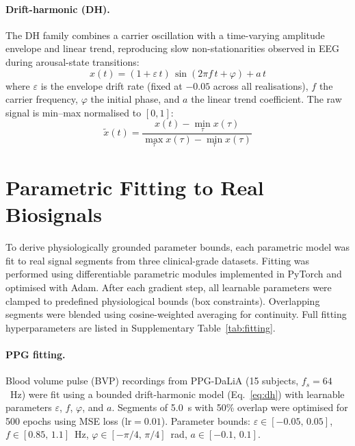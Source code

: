 \documentclass[11pt]{article}
\begin{document}
\paragraph{Drift-harmonic (DH).}
The DH family combines a carrier oscillation with a time-varying amplitude envelope and linear trend, reproducing slow non-stationarities observed in EEG during arousal-state transitions:
\begin{equation}
    x(t) = (1 + \varepsilon\, t)\,\sin(2\pi f\, t + \varphi) + a\, t
    \label{eq:dh}
\end{equation}
where $\varepsilon$ is the envelope drift rate (fixed at $-0.05$ across all realisations), $f$ the carrier frequency, $\varphi$ the initial phase, and $a$ the linear trend coefficient. The raw signal is min--max normalised to $[0, 1]$:
\begin{equation}
    \tilde{x}(t) = \frac{x(t) - \min_\tau x(\tau)}{\max_\tau x(\tau) - \min_\tau x(\tau)}
    \label{eq:dh_norm}
\end{equation}

\section{Parametric Fitting to Real Biosignals}
\label{sec:fitting}

To derive physiologically grounded parameter bounds, each parametric model was fit to real signal segments from three clinical-grade datasets. Fitting was performed using differentiable parametric modules implemented in PyTorch and optimised with Adam. After each gradient step, all learnable parameters were clamped to predefined physiological bounds (box constraints). Overlapping segments were blended using cosine-weighted averaging for continuity. Full fitting hyperparameters are listed in Supplementary Table~\ref{tab:fitting}.

\paragraph{PPG fitting.}
Blood volume pulse (BVP) recordings from PPG-DaLiA (15 subjects, $f_s = 64$~Hz) were fit using a bounded drift-harmonic model (Eq.~\eqref{eq:dh}) with learnable parameters $\varepsilon$, $f$, $\varphi$, and $a$. Segments of 5.0~s with 50\% overlap were optimised for 500 epochs using MSE loss ($\mathrm{lr} = 0.01$). Parameter bounds: $\varepsilon \in [-0.05,\, 0.05]$, $f \in [0.85,\, 1.1]$~Hz, $\varphi \in [-\pi/4,\, \pi/4]$~rad, $a \in [-0.1,\, 0.1]$.
\end{document}
